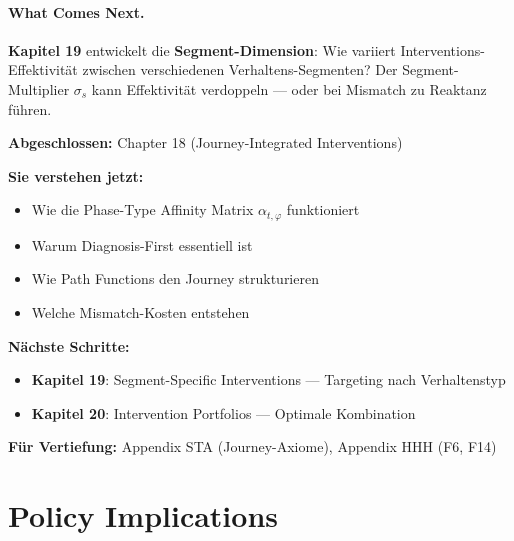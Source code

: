 \paragraph{What Comes Next.}
\textbf{Kapitel 19} entwickelt die \textbf{Segment-Dimension}: Wie variiert Interventions-Effektivität zwischen verschiedenen Verhaltens-Segmenten? Der Segment-Multiplier $\sigma_s$ kann Effektivität verdoppeln --- oder bei Mismatch zu Reaktanz führen.



\begin{tcolorbox}[colback=gray!5!white, colframe=gray!75!black,
    title=Empfohlene Lesepfade]

\textbf{Abgeschlossen:} Chapter 18 (Journey-Integrated Interventions)

\textbf{Sie verstehen jetzt:}
\begin{itemize}[nosep]
\item Wie die Phase-Type Affinity Matrix $\alpha_{t,\varphi}$ funktioniert
\item Warum Diagnosis-First essentiell ist
\item Wie Path Functions den Journey strukturieren
\item Welche Mismatch-Kosten entstehen
\end{itemize}

\textbf{Nächste Schritte:}
\begin{itemize}[nosep]
\item \textbf{Kapitel 19}: Segment-Specific Interventions --- Targeting nach Verhaltenstyp
\item \textbf{Kapitel 20}: Intervention Portfolios --- Optimale Kombination
\end{itemize}

\textbf{Für Vertiefung:} Appendix STA (Journey-Axiome), Appendix HHH (F6, F14)
\end{tcolorbox}



\section*{Policy Implications}

